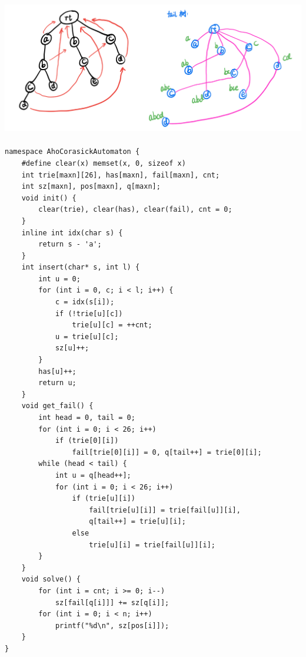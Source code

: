 \begin{center}
    \includegraphics[height=6cm]{chapters/ch4-string-and-palindrome/images/fail.png}
\end{center}

\begin{verbatim}
namespace AhoCorasickAutomaton {
    #define clear(x) memset(x, 0, sizeof x)
    int trie[maxn][26], has[maxn], fail[maxn], cnt;
    int sz[maxn], pos[maxn], q[maxn];
    void init() {
        clear(trie), clear(has), clear(fail), cnt = 0;
    }
    inline int idx(char s) {
        return s - 'a';
    }
    int insert(char* s, int l) {
        int u = 0;
        for (int i = 0, c; i < l; i++) {
            c = idx(s[i]);
            if (!trie[u][c])
                trie[u][c] = ++cnt;
            u = trie[u][c];
            sz[u]++;
        }
        has[u]++;
        return u;
    }
    void get_fail() {
        int head = 0, tail = 0;
        for (int i = 0; i < 26; i++)
            if (trie[0][i])
                fail[trie[0][i]] = 0, q[tail++] = trie[0][i];
        while (head < tail) {
            int u = q[head++];
            for (int i = 0; i < 26; i++)
                if (trie[u][i])
                    fail[trie[u][i]] = trie[fail[u]][i],
                    q[tail++] = trie[u][i];
                else
                    trie[u][i] = trie[fail[u]][i];
        }
    }
    void solve() {
        for (int i = cnt; i >= 0; i--)
            sz[fail[q[i]]] += sz[q[i]];
        for (int i = 0; i < n; i++)
            printf("%d\n", sz[pos[i]]);
    }
}    
\end{verbatim}